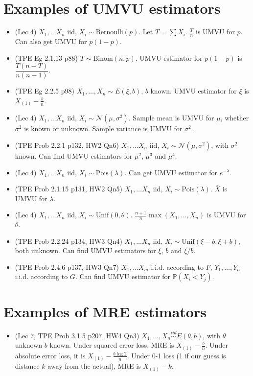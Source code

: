 \documentclass[twoside]{article}
\newcommand{\dis}{\displaystyle}
\newcommand\bbP{\mathbb{P}}
\newcommand\calN{\mathcal{N}}
\newcommand\lmb{\lambda}
\newcommand\sg{\sigma}
\def\t{\theta}
\begin{document}
\section*{Examples of UMVU estimators}
\begin{itemize}
\item (Lec 4) $X_1, \dots X_n$ iid, $X_i \sim \text{Bernoulli}(p)$. Let $T = \sum X_i$. $\displaystyle\frac{T}{n}$ is UMVU for $p$. Can also get UMVU for $p(1-p)$.

\item (TPE Eg 2.1.13 p88) $T \sim \text{Binom}(n,p)$. UMVU estimator for $p(1-p)$ is $\dfrac{T(n-T)}{n(n-1)}$.

\item (TPE Eg 2.2.5 p98) $X_1, \dots, X_n \sim E(\xi, b)$, $b$ known. UMVU estimator for $\xi$ is $X_{(1)} - \dis\frac{b}{n}$.

\item (Lec 4) $X_1, \dots X_n$ iid, $X_i \sim \calN(\mu, \sg^2)$. Sample mean is UMVU for $\mu$, whether $\sg^2$ is known or unknown. Sample variance is UMVU for $\sg^2$.

\item (TPE Prob 2.2.1 p132, HW2 Qn6) $X_1, \dots X_n$ iid, $X_i \sim \calN(\mu, \sg^2)$, with $\sg^2$ known. Can find UMVU estimators for $\mu^2$, $\mu^3$ and $\mu^4$.

\item (Lec 4) $X_1, \dots X_n$ iid, $X_i \sim \text{Pois}(\lmb)$. Can get UMVU estimator for $e^{-\lmb}$.

\item (TPE Prob 2.1.15 p131, HW2 Qn5) $X_1, \dots X_n$ iid, $X_i \sim \text{Pois}(\lmb)$. $\bar{X}$ is UMVU for $\lmb$.

\item (Lec 4) $X_1, \dots X_n$ iid, $X_i \sim \text{Unif}(0, \t)$. $\displaystyle\frac{n+1}{n} \max(X_1, \dots, X_n)$ is UMVU for $\t$.

\item (TPE Prob 2.2.24 p134, HW3 Qn4) $X_1, \dots X_n$ iid, $X_i \sim \text{Unif}(\xi - b, \xi + b)$, both unknown. Can find UMVU estimators for $\xi$, $b$ and $\xi/b$.

\item (TPE Prob 2.4.6 p137, HW3 Qn7) $X_1, \dots X_m$ i.i.d. according to $F$, $Y_1, \dots, Y_n$ i.i.d. according to $G$. Can find UMVU estimator for $\bbP(X_i < Y_j)$.
\end{itemize}

\section*{Examples of MRE estimators}
\begin{itemize}
\item (Lec 7, TPE Prob 3.1.5 p207, HW4 Qn3) $X_1, \dots, X_n \stackrel{iid}{\sim} E(\t,b)$, with $\t$ unknown $b$ known. Under squared error loss, MRE is $X_{(1)} - \displaystyle\frac{b}{n}$. Under absolute error loss, it is $X_{(1)} - \displaystyle\frac{b \log 2}{n}$. Under 0-1 loss (1 if our guess is distance $k$ away from the actual), MRE is $X_{(1)} - k$.
\end{itemize}
\end{document}
